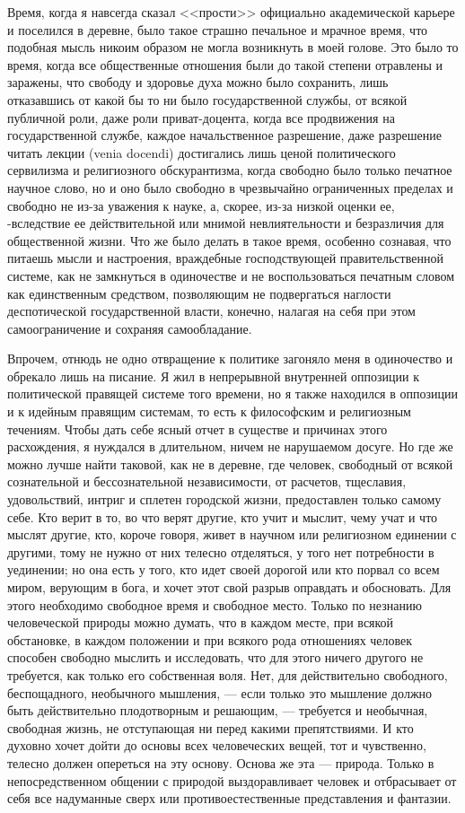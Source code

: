 \documentclass[12pt]{article}
\begin{document}
Время, когда я навсегда сказал <<прости>> официально академической карьере и поселился в деревне, было такое страшно печальное и мрачное время, что подобная мысль никоим образом не могла возникнуть в моей голове. Это было то время, когда все общественные отношения были до такой степени отравлены и заражены, что свободу и здоровье духа можно было сохранить, лишь отказавшись от какой бы то ни было государственной службы, от всякой публичной роли, даже роли приват-доцента, когда все продвижения на государственной службе, каждое начальственное разрешение, даже разрешение читать лекции (venia docendi) достигались лишь ценой политического сервилизма и религиозного обскурантизма, когда свободно было только печатное научное слово, но и оно было свободно в чрезвычайно ограниченных пределах и свободно не из-за уважения к науке, а, скорее, из-за низкой оценки ее, -вследствие ее действительной или мнимой невлиятельности и безразличия для общественной жизни. Что же было делать в такое время, особенно сознавая, что питаешь мысли и настроения, враждебные господствующей правительственной системе, как не замкнуться в одиночестве и не воспользоваться печатным словом как единственным средством, позволяющим не подвергаться наглости деспотической государственной власти, конечно, налагая на себя при этом самоограничение и сохраняя самообладание. 

Впрочем, отнюдь не одно отвращение к политике загоняло меня в одиночество и обрекало лишь на писание. Я жил в непрерывной внутренней оппозиции к политической правящей системе того времени, но я также находился в оппозиции и к идейным правящим системам, то есть к философским и религиозным течениям. Чтобы дать себе ясный отчет в существе и причинах этого расхождения, я нуждался в длительном, ничем не нарушаемом досуге. Но где же можно лучше найти таковой, как не в деревне, где человек, свободный от всякой сознательной и бессознательной независимости, от расчетов, тщеславия, удовольствий, интриг и сплетен городской жизни, предоставлен только самому себе. Кто верит в то, во что верят другие, кто учит и мыслит, чему учат и что мыслят другие, кто, короче говоря, живет в научном или религиозном единении с другими, тому не нужно от них телесно отделяться, у того нет потребности в уединении; но она есть у того, кто идет своей дорогой или кто порвал со всем миром, верующим в бога, и хочет этот свой разрыв оправдать и обосновать. Для этого необходимо свободное время и свободное место. Только по незнанию человеческой природы можно думать, что в каждом месте, при всякой обстановке, в каждом положении и при всякого рода отношениях человек способен свободно мыслить и исследовать, что для этого ничего другого не требуется, как только его собственная воля. Нет, для действительно свободного, беспощадного, необычного мышления, --- если только это мышление должно быть действительно плодотворным и решающим, --- требуется и необычная, свободная жизнь, не отступающая ни перед какими препятствиями. И кто духовно хочет дойти до основы всех человеческих вещей, тот и чувственно, телесно должен опереться на эту основу. Основа же эта --- природа. Только в непосредственном общении с природой выздоравливает человек и отбрасывает от себя все надуманные сверх или противоестественные представления и фантазии. 
\end{document}
